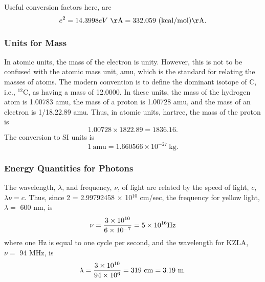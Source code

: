 Useful conversion factors here, are
\begin{equation}
e^2 = 14.3998eV\ \mathrm{\AA} = 332.059\ (\mathrm{kcal}/\mathrm{mol})\mathrm{\AA}.
\end{equation}

\subsubsection{Units for Mass}
    
In atomic units, the mass of the electron is unity. However, this is
not to be confused with the atomic mass unit, amu, which is the
standard for relating the masses of atoms. The modern convention is to
define the dominant isotope of C, i.e., $^{12}$C, as having a mass of
12.0000. In these units, the mass of the hydrogen atom is 1.00783 amu,
the mass of a proton is 1.00728 amu, and the mass of an electron is
1/18.22.89 amu. Thus, in atomic units, hartree, the mass of the proton
is
\begin{equation}
1.00728 \times 1822.89 = 1836.16.
\end{equation}
The conversion to SI units is
\begin{equation}
1\ \mathrm{amu} = 1.660566 \times 10^{-27}\ \mathrm{kg}.
\end{equation}

\subsubsection{Energy Quantities for Photons}
    
The wavelength, $\lambda$, and frequency, $\nu$, of light are related by the 
speed of light, $c$, $\lambda \nu = c$.  Thus, since 2 = 2.99792458 
$\times$ 10$^{10}$ cm/sec, the frequency for yellow light, 
$\lambda =$ 600 nm, is
\begin{equation}
\nu = {3 \times 10^{10} \over 6 \times 10^{-7}} = 5 \times 10^{16} 
\mathrm{Hz}
\end{equation}
where one Hz is equal to one cycle per second, and the wavelength for KZLA, 
$\nu =$ 94 MHz, is
\begin{equation}
\lambda = {3 \times 10^{10} \over 94 \times 10^6} = 319\ \mathrm{cm} =
3.19\ \mathrm{m}.
\end{equation}

